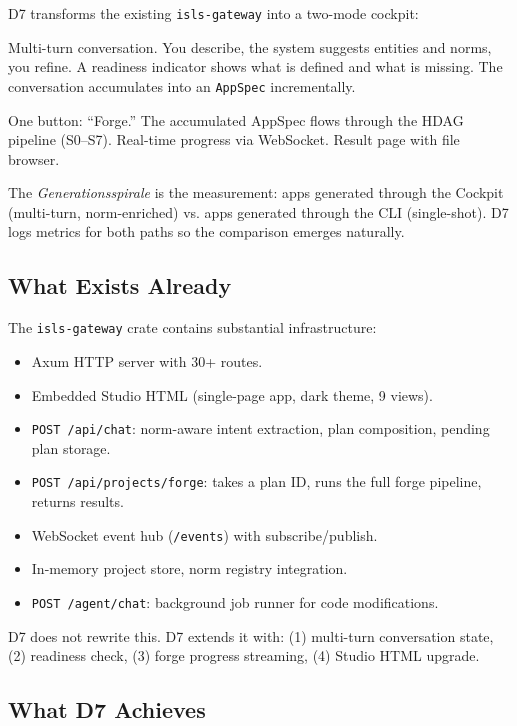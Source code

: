 \documentclass[11pt,a4paper]{article}
\begin{document}
D7 transforms the existing \texttt{isls-gateway} into a two-mode 
cockpit:

\begin{description}[nosep]
\item[Architekt-Modus] Multi-turn conversation. You describe, the 
  system suggests entities and norms, you refine. A readiness 
  indicator shows what is defined and what is missing. The 
  conversation accumulates into an \texttt{AppSpec} incrementally.
\item[Drucker-Modus] One button: ``Forge.'' The accumulated 
  AppSpec flows through the HDAG pipeline (S0--S7). Real-time 
  progress via WebSocket. Result page with file browser.
\end{description}

The \emph{Generationsspirale} is the measurement: apps generated 
through the Cockpit (multi-turn, norm-enriched) vs. apps generated 
through the CLI (single-shot). D7 logs metrics for both paths so 
the comparison emerges naturally.

\subsection{What Exists Already}

The \texttt{isls-gateway} crate contains substantial infrastructure:

\begin{itemize}[nosep]
\item Axum HTTP server with 30+ routes.
\item Embedded Studio HTML (single-page app, dark theme, 9 views).
\item \texttt{POST /api/chat}: norm-aware intent extraction, plan 
      composition, pending plan storage.
\item \texttt{POST /api/projects/forge}: takes a plan ID, runs the 
      full forge pipeline, returns results.
\item WebSocket event hub (\texttt{/events}) with subscribe/publish.
\item In-memory project store, norm registry integration.
\item \texttt{POST /agent/chat}: background job runner for code 
      modifications.
\end{itemize}

D7 does not rewrite this. D7 extends it with: (1) multi-turn 
conversation state, (2) readiness check, (3) forge progress 
streaming, (4) Studio HTML upgrade.

\subsection{What D7 Achieves}
\end{document}
